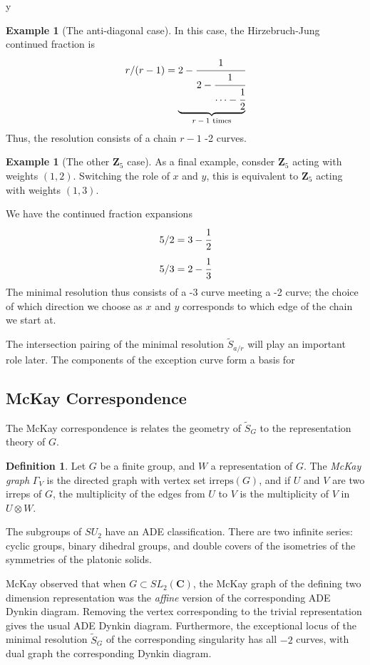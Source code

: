 y\documentclass{amsart}[12pt]
\theoremstyle{definition}
\newtheorem{example}[dummy]{Example}
\newtheorem{definition}[dummy]{Definition}
\newcommand{\Z}{\mathbf{Z}}
\newcommand{\C}{\mathbf{C}}
\newcommand{\irreps}{\text{irreps}}
\begin{document}
\begin{example}[The anti-diagonal case]  
In this case, the Hirzebruch-Jung continued fraction is
$$r/(r-1)=\underbrace{2-\cfrac{1}{2-\cfrac{1}{\cdots-\cfrac{1}{2}}}}_{\text{$r-1$ times}}$$
Thus, the resolution consists of a chain $r-1$ -2 curves.
\end{example}

\begin{example}[The other $\Z_5$ case]
As a final example, consder $\Z_5$ acting with weights $(1,2)$.  Switching the role of $x$ and $y$, this is equivalent to $\Z_5$ acting with weights $(1,3)$.

We have the continued fraction expansions
$$5/2=3-\cfrac{1}{2}$$
$$5/3=2-\cfrac{1}{3}$$
The minimal resolution thus consists of a -3 curve meeting a -2 curve; the choice of which direction we choose as $x$ and $y$ corresponds to which edge of the chain we start at.
\end{example}

The intersection pairing of the minimal resolution $\widetilde{S}_{a/r}$ will play an important role later.  The components of the exception curve form a basis for 


\subsection{McKay Correspondence}
The McKay correspondence is relates the geometry of $\widetilde{S}_G$ to the representation theory of $G$.

\begin{definition}
Let $G$ be a finite group, and $W$ a representation of $G$.  The \emph{McKay graph} $\Gamma_V$ is the directed graph with vertex set $\irreps(G)$, and if $U$ and $V$ are two irreps of $G$, the multiplicity of the edges from $U$ to $V$ is the multiplicity of $V$ in $U\otimes W$.
\end{definition}

The subgroups of $SU_2$ have an ADE classification.  There are two infinite series: cyclic groups, binary dihedral groups, and double covers of the isometries of the symmetries of the platonic solids.

McKay observed \cite{McKay} that when $G\subset SL_2(\C)$, the McKay graph of the defining two dimension representation was the \emph{affine} version of the corresponding ADE Dynkin diagram.  Removing the vertex corresponding to the trivial representation gives the usual ADE Dynkin diagram.  Furthermore, the exceptional locus of the minimal resolution $\widetilde{S}_G$ of the corresponding singularity has all $-2$ curves, with dual graph the corresponding Dynkin diagram. 
\end{document}

